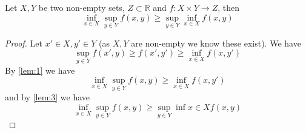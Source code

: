 \documentclass{article}
\begin{document}

\begin{theorem}
  Let $X, Y$ be two non-empty sets, $Z \subset \mathbb{R}$ and $f : X \times Y \to Z$, then
  $$
    \inf_{x \in X} \sup_{y \in Y} f(x, y) \ge \sup_{y \in Y} \inf_{x \in X} f(x, y)
  $$
\end{theorem}
\begin{proof}
  Let $x' \in X, y' \in Y$ (as $X, Y$ are non-empty we know these exist). We have
  $$
    \sup_{y \in Y} f(x', y) \ge f(x', y') \ge \inf_{x \in X} f(x, y')
  $$
  By \cref{lem:1} we have
  $$
    \inf_{x \in X} \sup_{y \in Y} f(x, y) \ge \inf_{x \in X} f(x, y')
  $$
  and by \cref{lem:3} we have
  $$
    \inf_{x \in X} \sup_{y \in Y} f(x, y) \ge \sup_{y \in Y} \inf{x \in X} f(x, y)
  $$
\end{proof}
\end{document}
